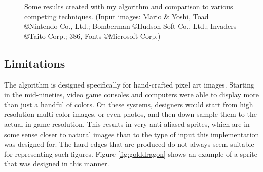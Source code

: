 \documentclass[]{usiinfbachelorproject}
\begin{document}
\begin{figure}[ht]
{	}
	\caption{Some results created with my algorithm and comparison to various competing techniques. (Input images: Mario \& Yoshi, Toad \copyright Nintendo Co., Ltd.; Bomberman \copyright Hudson Soft Co., Ltd.; Invaders \copyright Taito Corp.; 386, Fonts \copyright Microsoft Corp.)}
	\label{fig:allexamples}
\end{figure}

\subsection{Limitations} \label{sec:limitations}

The algorithm is designed specifically for hand-crafted pixel art images. Starting in the mid-nineties, video game consoles and computers were able to display more than just a handful of colors. On these systems, designers would start from high resolution multi-color images, or even photos, and then down-sample them to the actual in-game resolution. This results in very anti-aliased sprites, which are in some sense closer to natural images than to the type of input this implementation was designed for. The hard edges that are produced do not always seem suitable for representing such figures. Figure \ref{fig:golddragon} shows an example of a sprite that was designed in this manner.\\
\end{document}
